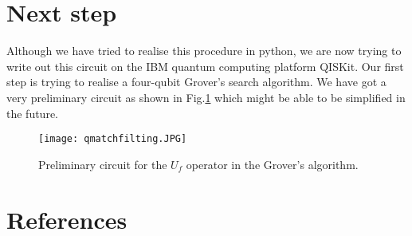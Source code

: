 \documentclass[a4paper]{jpconf}
\begin{document}
\section{Next step}
Although we have tried to realise this procedure in python, we are now trying to write out this circuit on the IBM quantum computing platform QISKit. Our first step is trying to realise a four-qubit Grover's search algorithm. We have got a very preliminary circuit as shown in Fig.\ref{q1} which might be able to be simplified in the future. 
\begin{figure}[h]
\texttt{[image: qmatchfilting.JPG]}
\caption{\label{q1} Preliminary circuit for the $U_f$ operator in the Grover's algorithm. }
\end{figure}
\section*{References}

\end{document}
